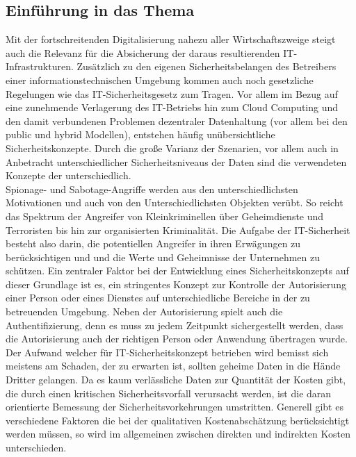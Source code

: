 \documentclass[
book,
a4paper,   
titlepage,  
halfparskip,
12pt        
]{scrartcl}
\begin{document}
\begin{onehalfspacing}
\subsection{Einführung in das Thema}
\label{subsec:einfuehrung}
Mit der fortschreitenden Digitalisierung nahezu aller Wirtschaftszweige steigt auch die Relevanz für die Absicherung der daraus resultierenden \ac{IT}-Infrastrukturen.
Zusätzlich zu den eigenen Sicherheitsbelangen des Betreibers einer informationstechnischen Umgebung kommen auch noch gesetzliche Regelungen wie das IT-Sicherheitsgesetz zum Tragen. 
Vor allem im Bezug auf eine zunehmende Verlagerung des \ac{IT}-Betriebs hin zum Cloud Computing und den damit verbundenen Problemen dezentraler Datenhaltung (vor allem bei den public und hybrid Modellen), entstehen häufig unübersichtliche Sicherheitskonzepte. Durch die große Varianz der Szenarien, vor allem auch in Anbetracht unterschiedlicher Sicherheitsniveaus der Daten sind die verwendeten Konzepte der unterschiedlich.\cite[S. 7f]{risiko}\\
Spionage- und Sabotage-Angriffe werden aus den unterschiedlichsten Motivationen und auch von den Unterschiedlichsten Objekten verübt. So reicht das Spektrum der Angreifer von Kleinkriminellen über Geheimdienste und Terroristen bis hin zur organisierten Kriminalität. Die Aufgabe der \ac{IT}-Sicherheit besteht also darin, die potentiellen Angreifer in ihren Erwägungen zu berücksichtigen und und die Werte und Geheimnisse der Unternehmen zu schützen. Ein zentraler Faktor bei der Entwicklung eines Sicherheitskonzepts auf dieser Grundlage ist es, ein stringentes Konzept zur Kontrolle der Autorisierung einer Person oder eines Dienstes auf unterschiedliche Bereiche in der zu betreuenden Umgebung. Neben der Autorisierung spielt auch die Authentifizierung, denn es muss zu jedem Zeitpunkt sichergestellt werden, dass die Autorisierung auch der richtigen Person oder Anwendung übertragen wurde.\cite[S. 9]{risiko}\\
Der Aufwand welcher für \ac{IT}-Sicherheitskonzept betrieben wird bemisst sich meistens am Schaden, der zu erwarten ist, sollten geheime Daten in die Hände Dritter gelangen. Da es kaum verlässliche Daten zur Quantität der Kosten gibt, die durch einen kritischen Sicherheitsvorfall verursacht werden, ist die daran orientierte Bemessung der Sicherheitsvorkehrungen umstritten. Generell gibt es verschiedene Faktoren die bei der qualitativen Kostenabschätzung berücksichtigt werden müssen, so wird im allgemeinen zwischen direkten und indirekten Kosten unterschieden.\cite[S. 12]{kosten}

\end{onehalfspacing}
\end{document}
